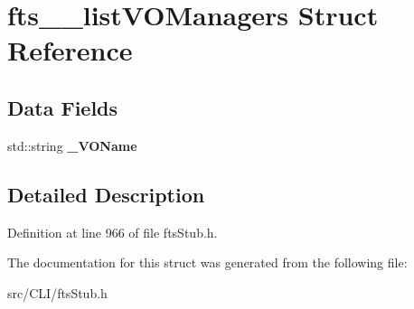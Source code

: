 \section{fts\_\-\_\-listVOManagers Struct Reference}
\label{structfts____listVOManagers}
\subsection*{Data Fields}
\begin{DoxyCompactItemize}
\item 
std::string {\bfseries \_\-VOName}\label{structfts____listVOManagers_a5cab63b732ad1e01408db6da278384bc}

\end{DoxyCompactItemize}


\subsection{Detailed Description}


Definition at line 966 of file ftsStub.h.



The documentation for this struct was generated from the following file:\begin{DoxyCompactItemize}
\item 
src/CLI/ftsStub.h\end{DoxyCompactItemize}
